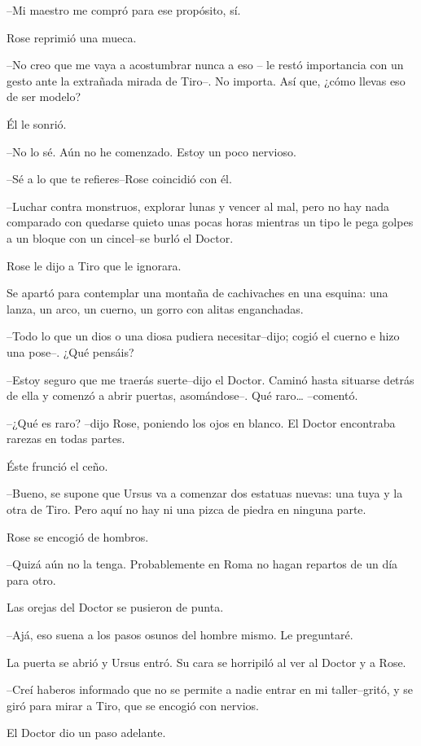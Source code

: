 --Mi maestro me compró para ese propósito, sí.

Rose reprimió una mueca.

--No creo que me vaya a acostumbrar nunca a eso -- le restó importancia
con un gesto ante la extrañada mirada de Tiro--. No importa. Así que,
¿cómo llevas eso de ser modelo?

Él le sonrió.

--No lo sé. Aún no he comenzado. Estoy un poco nervioso.

--Sé a lo que te refieres--Rose coincidió con él.

--Luchar contra monstruos, explorar lunas y vencer al mal, pero no hay
nada comparado con quedarse quieto unas pocas horas mientras un tipo le
pega golpes a un bloque con un cincel--se burló el Doctor.

Rose le dijo a Tiro que le ignorara.

Se apartó para contemplar una montaña de cachivaches en una esquina: una
lanza, un arco, un cuerno, un gorro con alitas enganchadas.

--Todo lo que un dios o una diosa pudiera necesitar--dijo; cogió el
cuerno e hizo una pose--. ¿Qué pensáis?

--Estoy seguro que me traerás suerte--dijo el Doctor. Caminó hasta
situarse detrás de ella y comenzó a abrir puertas, asomándose--. Qué
raro\ldots{} --comentó.

--¿Qué es raro? --dijo Rose, poniendo los ojos en blanco. El Doctor
encontraba rarezas en todas partes.

Éste frunció el ceño.

--Bueno, se supone que Ursus va a comenzar dos estatuas nuevas: una tuya
y la otra de Tiro. Pero aquí no hay ni una pizca de piedra en ninguna
parte.

Rose se encogió de hombros.

--Quizá aún no la tenga. Probablemente en Roma no hagan repartos de un
día para otro.

Las orejas del Doctor se pusieron de punta.

--Ajá, eso suena a los pasos osunos del hombre mismo. Le preguntaré.

La puerta se abrió y Ursus entró. Su cara se horripiló al ver al Doctor
y a Rose.

--Creí haberos informado que no se permite a nadie entrar en mi
taller--gritó, y se giró para mirar a Tiro, que se encogió con nervios.

El Doctor dio un paso adelante.

